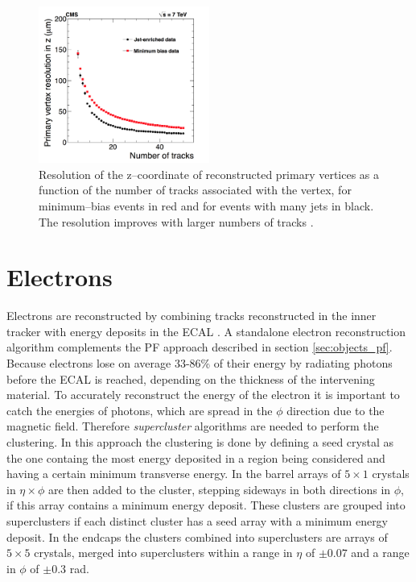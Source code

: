 \begin{figure}
\includegraphics[width=0.5\textwidth]{./Objects/Plots/PrimaryVertexRes.png}
\caption{Resolution of the z--coordinate of reconstructed primary vertices
as a function of the number of tracks associated with the vertex, 
for minimum--bias events in red and for
events with many jets in black. The resolution improves
with larger numbers of tracks \cite{cms-trk-algos}.}
\label{fig:objects_tracks_pvres}
\end{figure}

\section{Electrons}
\label{sec:objects_ele}
Electrons are reconstructed by combining tracks reconstructed
in the inner tracker with energy deposits in the \ac{ECAL} \cite{cms-elereco-run1}.
A standalone electron reconstruction algorithm \cite{cms-elereco-run1} complements the \ac{PF} approach
described in section \ref{sec:objects_pf}. Because electrons lose on average 33-86\% of
their energy by radiating photons before the \ac{ECAL} is reached, depending on the thickness of
the intervening material. To accurately reconstruct the energy of the electron it is
important to catch the energies of photons, which are spread in the $\phi$ direction
due to the magnetic field. Therefore \textit{supercluster} algorithms are needed to perform
the clustering. In this approach the clustering
is done by defining a seed crystal as the one containg the most energy deposited
in a region being considered and having a certain minimum transverse energy.
In the barrel arrays of $5\times 1$ crystals in $\eta \times \phi$ are then added
to the cluster, stepping sideways in both directions in $\phi$, if this
array contains a minimum energy deposit. These clusters are grouped into 
superclusters if each distinct cluster has a seed array with a minimum energy deposit.
In the endcaps the clusters combined into superclusters are arrays of $5\times 5$ crystals,
merged into superclusters within a range in $\eta$ of $\pm 0.07$ and a range in $\phi$ of $\pm 0.3$ rad.

